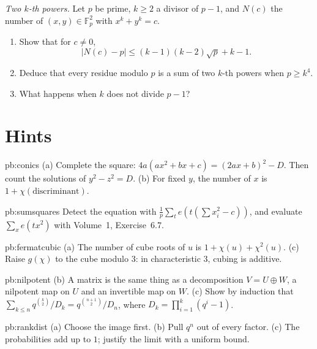\begin{exercise}[$\star\star\star$]\label{pb:waring}
\emph{Two $k$-th powers.} Let $p$ be prime, $k\ge2$ a divisor of $p-1$, and $N(c)$ the number of $(x,y)\in\mathbb F_p^2$ with
$x^k+y^k=c$.
\begin{enumerate}[label=(\alph*)]
\item Show that for $c\ne0$,
\[
|N(c)-p|\le(k-1)(k-2)\sqrt p+k-1.
\]
\item Deduce that every residue modulo $p$ is a sum of two $k$-th powers when $p\ge k^4$.
\item What happens when $k$ does not divide $p-1$?
\end{enumerate}
\end{exercise}

\section{Hints}

\begin{hint}{pb:conics}
(a) Complete the square: $4a(ax^2+bx+c)=(2ax+b)^2-D$. Then count the solutions of $y^2-z^2=D$. (b) For fixed $y$, the number of
$x$ is $1+\chi(\text{discriminant})$.
\end{hint}

\begin{hint}{pb:sumsquares}
Detect the equation with $\frac1p\sum_te(t(\sum x_i^2-c))$, and evaluate $\sum_xe(tx^2)$ with Volume~1, Exercise~6.7.
\end{hint}

\begin{hint}{pb:fermatcubic}
(a) The number of cube roots of $u$ is $1+\chi(u)+\chi^2(u)$. (c) Raise $g(\chi)$ to the cube modulo $3$: in characteristic $3$,
cubing is additive.
\end{hint}

\begin{hint}{pb:nilpotent}
(b) A matrix is the same thing as a decomposition $V=U\oplus W$, a nilpotent map on $U$ and an invertible map on $W$. (c) Show
by induction that $\sum_{k\le n}q^{\binom k2}/D_k=q^{\binom{n+1}2}/D_n$, where $D_k=\prod_{i=1}^k(q^i-1)$.
\end{hint}

\begin{hint}{pb:rankdist}
(a) Choose the image first. (b) Pull $q^{n}$ out of every factor. (c) The probabilities add up to $1$; justify the limit with a
uniform bound.
\end{hint}

